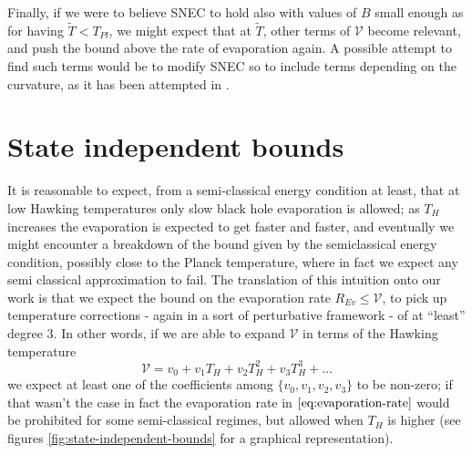 Finally, if we were to believe SNEC to hold also with values of \(B\) small enough as for having \(\tilde{T} < T_{Pl}\), we might expect that at \(\tilde{T}\), other terms of \(\mathcal{V}\) become relevant, and push the bound above the rate of evaporation again.
A possible attempt to find such terms would be to modify SNEC so to include terms depending on the curvature, as it has been attempted in \cite{kontou2015quantum}.

\section{State independent bounds}
\label{subsec:state-independent-bounds}
It is reasonable to expect, from a semi-classical energy condition at least, that at low Hawking temperatures only slow black hole evaporation is allowed; as \(T_H\) increases the evaporation is expected to get faster and faster, and eventually we might encounter a breakdown of the bound given by the semiclassical energy condition, possibly close to the Planck temperature, where in fact we expect any semi classical approximation to fail.
\noindent
The translation of this intuition onto our work is that we expect the bound on the evaporation rate \(R_{Ev} \le \mathcal{V}\), to pick up temperature corrections - again in a sort of perturbative framework - of at ``least'' degree \(3\).
In other words, if we are able to expand \(\mathcal{V}\) in terms of the Hawking temperature
\[
\mathcal{V} = v_0 + v_1T_H + v_2T_H^2 + v_3T_H^3 + \ldots	
\]
we expect at least one of the coefficients among \(\{v_0, v_1, v_2, v_3\}\) to be non-zero; if that wasn't the case in fact the evaporation rate in \(\eqref{eq:evaporation-rate}\) would be prohibited for some semi-classical regimes, but allowed when \(T_H\) is higher (see figures \ref{fig:state-independent-bounds} for a graphical representation).

